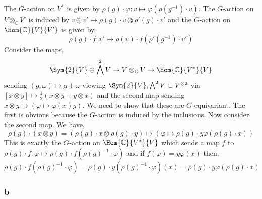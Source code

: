 \documentclass[12pt]{article}
\renewcommand{\C}{\mathbb{C}}
\begin{document}
The $G$-action on $V^*$ is given by $\rho(g) \cdot \varphi : v \mapsto \varphi(\rho(g^{-1}) \cdot v)$. The $G$-action on $V \otimes_\C V'$ is induced by $v \otimes v' \mapsto \rho(g) \cdot v \otimes \rho'(g) \cdot v'$ and the $G$-action on $\Hom{\C}{V}{V'}$ is given by,
\[ \rho(g) \cdot f : v' \mapsto \rho(v) \cdot f(\rho'(g^{-1}) \cdot v') \]
Consider the maps,
\[ \Sym{2}{V} \oplus \bigwedge^2 V \to V \otimes_\C V \to \Hom{\C}{V^*}{V} \]
sending $(g, \omega) \mapsto g + \omega$ viewing $\Sym{2}{V}, \bigwedge^2 V \subset V^{\otimes 2}$ via $[x \otimes y] \mapsto \tfrac{1}{2} (x \otimes y \pm y \otimes x)$ and the second map sending $x \otimes y \mapsto (\varphi \mapsto \varphi(x) y)$. We need to show that these are $G$-equivariant. The first is obvious because the $G$-action is induced by the inclusions. Now consider the second map. We have,
\[ \rho(g) \cdot (x \otimes y) = (\rho(g) \cdot x \otimes \rho(g) \cdot y) \mapsto (\varphi \mapsto \rho(g) \cdot y \varphi(\rho(g) \cdot x)) \]
This is exactly the $G$-action on $\Hom{\C}{V^*}{V}$ which sends a map $f$ to $\rho(g) \cdot f : \varphi \mapsto \rho(g) \cdot f(\rho(g)^{-1} \cdot \varphi)$ and if $f(\varphi) = y \varphi(x)$ then,
\[ \rho(g) \cdot f(\rho(g)^{-1} \cdot \varphi) = \rho(g) \cdot y (\rho(g)^{-1} \cdot \varphi)(x) = \rho(g) \cdot y \varphi(\rho(g) \cdot x) \]

\subsubsection{b}
\end{document}
